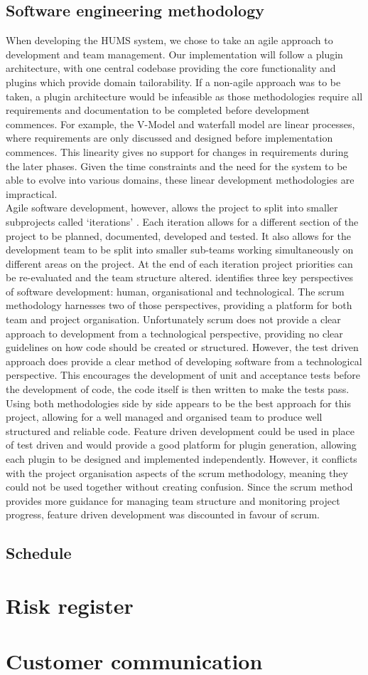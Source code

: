 \documentclass[10pt,a4paper]{article}
\begin{document}
\subsection{Software engineering methodology}
When developing the HUMS system, we chose to take an agile approach to development and team management. Our implementation will follow a plugin architecture, with one central codebase providing the core functionality and plugins which provide domain tailorability. If a non-agile approach was to be taken, a plugin architecture would be infeasible as those methodologies require all requirements and documentation to be completed before development commences. For example, the V-Model and waterfall model are linear processes, where requirements are only discussed and designed before implementation commences. This linearity gives no support for changes in requirements during the later phases. Given the time constraints and the need for the system to be able to evolve into various domains, these linear development methodologies are impractical. \\
Agile software development, however, allows the project to split into smaller subprojects called `iterations' \cite{hazzan2008agile}. Each iteration allows for a different section of the project to be planned, documented, developed and tested. It also allows for the development team to be split into smaller sub-teams working simultaneously on different areas on the project. At the end of each iteration project priorities can be re-evaluated and the team structure altered. 
\cite{hazzan2008agile} identifies three key perspectives of software development: human, organisational and technological. The scrum methodology harnesses two of those perspectives, providing a platform for both team and project organisation. Unfortunately scrum does not provide a clear approach to development from a technological perspective, providing no clear guidelines on how code should be created or structured. However, the test driven approach does provide a clear method of developing software from a technological perspective. This encourages the development of unit and acceptance tests before the development of code, the code itself is then written to make the tests pass. Using both methodologies side by side appears to be the best approach for this project, allowing for a well managed and organised team to produce well structured and reliable code. Feature driven development could be used in place of test driven and would provide a good platform for plugin generation, allowing each plugin to be designed and implemented independently. However, it conflicts with the project organisation aspects of the scrum methodology, meaning they could not be used together without creating confusion. Since the scrum method provides more guidance for managing team structure and monitoring project progress, feature driven development was discounted in favour of scrum.

\subsection{Schedule}


\section{Risk register}
%

\section{Customer communication}
\end{document}
